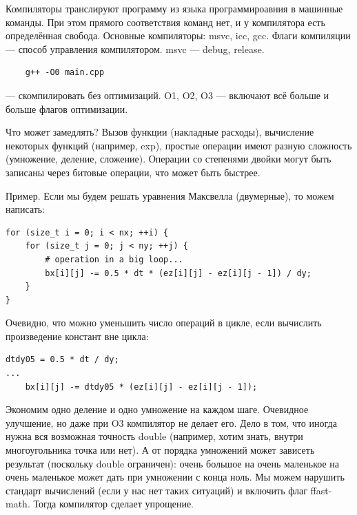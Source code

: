 \documentclass{book}
\begin{document}
Компиляторы транслируют программу из языка программироавния в машинные команды. При этом прямого
соответствия команд нет, и у компилятора есть определённая свобода. Основные компиляторы: msvc,
icc, gcc. Флаги компиляции --- способ управления компилятором. msvc --- debug, release.
\begin{verbatim}
    g++ -O0 main.cpp
\end{verbatim}
--- скомпилировать без оптимизаций. O1, O2, O3 --- включают всё больше и больше флагов оптимизации.

Что может замедлять? Вызов функции (накладные расходы), вычисление некоторых функций (например,
exp), простые операции имеют разную сложность (умножение, деление, сложение). Операции со степенями
двойки могут быть записаны через битовые операции, что может быть быстрее.

Пример. Если мы будем решать уравнения Максвелла (двумерные), то можем написать:
\begin{verbatim}
for (size_t i = 0; i < nx; ++i) {
    for (size_t j = 0; j < ny; ++j) {
        # operation in a big loop...
        bx[i][j] -= 0.5 * dt * (ez[i][j] - ez[i][j - 1]) / dy;
    }
}
\end{verbatim}
Очевидно, что можно уменьшить число операций в цикле, если вычислить произведение констант вне
цикла:
\begin{verbatim}
dtdy05 = 0.5 * dt / dy;
...
    bx[i][j] -= dtdy05 * (ez[i][j] - ez[i][j - 1]);
\end{verbatim}
Экономим одно деление и одно умножение на каждом шаге. Очевидное улучшение, но даже при O3
компилятор не делает его. Дело в том, что иногда нужна вся возможная точность double (например,
хотим знать, внутри многоугольника точка или нет). А от порядка умножений может зависеть результат
(поскольку double ограничен): очень большое на очень маленькое на очень маленькое может дать при
умножении с конца ноль. Мы можем нарушить стандарт вычислений (если у нас нет таких ситуаций) и
включить флаг ffast-math. Тогда компилятор сделает упрощение.
\end{document}
